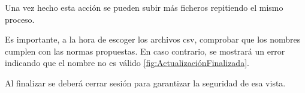 
Una vez hecho esta acción se pueden subir más ficheros repitiendo el mismo proceso. 

Es importante, a la hora de escoger los archivos csv, comprobar que los nombres cumplen con las normas propuestas. En caso contrario, se mostrará un error indicando que el nombre no es válido \ref{fig:ActualizaciónFinalizada}. 


Al finalizar se deberá cerrar sesión para garantizar la seguridad de esa vista.
